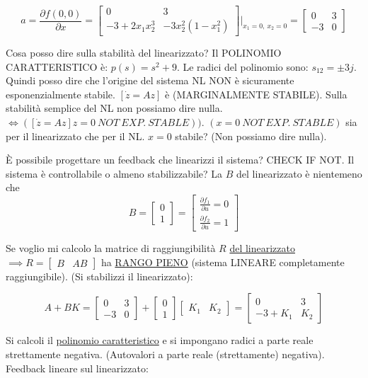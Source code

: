\begin{itemize}
\[
	a = \frac{\partial{f(0,0)}}{\partial{x}} = \begin{bmatrix}0&3\\-3+2x_1x_2^3&-3x_2^2(1-x_1^2)\end{bmatrix}|_{x_1=0,\ x_2=0} = \begin{bmatrix}0&3\\-3&0\end{bmatrix}
\]

Cosa posso dire sulla stabilità del linearizzato? Il POLINOMIO CARATTERISTICO è: $p(s) = s^2 + 9$. Le radici del polinomio sono: $s_{12} = \pm 3j$. Quindi posso dire che l'origine del sistema NL NON è sicuramente esponenzialmente stabile. $[\dot{z} = Az]$ è (MARGINALMENTE STABILE). Sulla stabilità semplice del NL non possiamo dire nulla. $\iff ([\dot{z}=Az] z=0\ NOT\ EXP.\ STABLE))$. $(x=0\ NOT\ EXP.\ STABLE)$ sia per il linearizzato che per il NL. $x=0$ stabile? (Non possiamo dire nulla).

\`E possibile progettare un feedback che linearizzi il sistema? CHECK IF NOT. Il sistema è controllabile o almeno stabilizzabile? La $B$ del linearizzato è nientemeno che
\[
	B=\begin{bmatrix}0\\1\end{bmatrix} = \begin{bmatrix}\frac{\partial{f_1}}{\partial{u}}=0\\\frac{\partial{f_2}}{\partial{u}}=1\end{bmatrix}
\]

Se voglio mi calcolo la matrice di raggiungibilità $R$ \underline{del linearizzato} $\implies R=\begin{bmatrix}B&AB\end{bmatrix}$ ha \underline{RANGO PIENO} (sistema LINEARE completamente raggiungibile). (Si stabilizzi il linearizzato):

\[
	A+BK = \begin{bmatrix}0&3\\-3&0\end{bmatrix} + \begin{bmatrix}0\\1\end{bmatrix}\begin{bmatrix}K_1&K_2\end{bmatrix} = \begin{bmatrix}0&3\\-3+K_1&K_2\end{bmatrix}
\]

Si calcoli il \underline{polinomio caratteristico} e si impongano radici a parte reale strettamente negativa. (Autovalori a parte reale (strettamente) negativa). Feedback lineare sul linearizzato:


\end{itemize}
